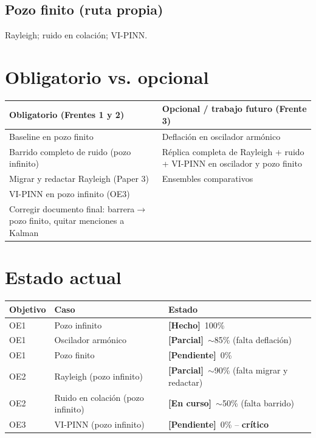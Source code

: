 \documentclass[11pt]{article}
\newcommand{\done}{\textcolor{green!50!black}{\textbf{[Hecho]}}}
\newcommand{\pdone}{\textcolor{orange!80!black}{\textbf{[Parcial]}}}
\newcommand{\pending}{\textcolor{red!70!black}{\textbf{[Pendiente]}}}
\newcommand{\progress}{\textcolor{blue!60!black}{\textbf{[En curso]}}}
\begin{document}
\subsection{Pozo finito (ruta propia)}
Rayleigh; ruido en colación; VI-PINN.

\section{Obligatorio vs. opcional}

\begin{center}
\begin{tabular}{p{} p{}}
\toprule
\textbf{Obligatorio (Frentes 1 y 2)} & \textbf{Opcional / trabajo futuro (Frente 3)} \\
\midrule
Baseline en pozo finito &
Deflación en oscilador armónico \\[4pt]
Barrido completo de ruido (pozo infinito) &
Réplica completa de Rayleigh + ruido + VI-PINN en oscilador y pozo finito \\[4pt]
Migrar y redactar Rayleigh (Paper 3) &
Ensembles comparativos \\[4pt]
VI-PINN en pozo infinito (OE3) & \\[4pt]
Corregir documento final: barrera$\to$pozo finito, quitar menciones a Kalman & \\
\bottomrule
\end{tabular}
\end{center}

\section{Estado actual}

\begin{center}
\begin{tabular}{lll}
\toprule
\textbf{Objetivo} & \textbf{Caso} & \textbf{Estado} \\
\midrule
OE1 & Pozo infinito & \done\ 100\% \\
OE1 & Oscilador armónico & \pdone\ $\sim$85\% (falta deflación) \\
OE1 & Pozo finito & \pending\ 0\% \\
OE2 & Rayleigh (pozo infinito) & \pdone\ $\sim$90\% (falta migrar y redactar) \\
OE2 & Ruido en colación (pozo infinito) & \progress\ $\sim$50\% (falta barrido) \\
OE3 & VI-PINN (pozo infinito) & \pending\ 0\% -- \textbf{crítico} \\
\bottomrule
\end{tabular}
\end{center}
\end{document}
